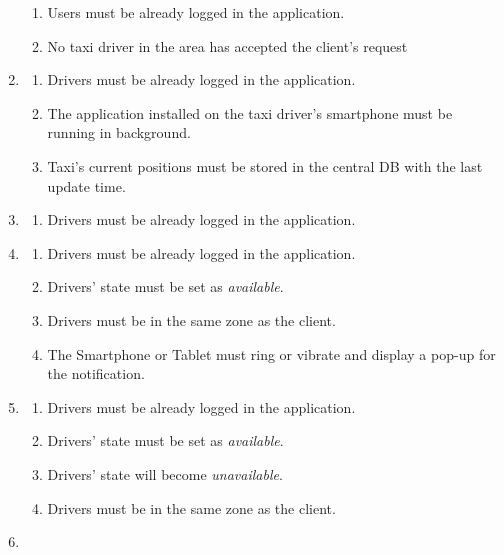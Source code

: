 \documentclass[a4paper]{article}
\begin{document}
\begin{enumerate}[label=\bfseries G\arabic*:]
\begin{enumerate}[label=\bfseries R\arabic*:]
        \item Users must be already logged in the application.
        \item No taxi driver in the area has accepted the client's request
        \end{enumerate}
    \item
        \begin{enumerate}[label=\bfseries R\arabic*:]
        \item Drivers must be already logged in the application.
        \item The application installed on the taxi driver's smartphone must be running in background.
        \item Taxi's current positions must be stored in the central DB with the last update time.
        \end{enumerate}
    \item
        \begin{enumerate}[label=\bfseries R\arabic*:]
        \item Drivers must be already logged in the application.
        \end{enumerate}
    \item
        \begin{enumerate}[label=\bfseries R\arabic*:]
        \item Drivers must be already logged in the application.
        \item Drivers' state must be set as \emph{available}.
        \item Drivers must be in the same zone as the client.
        \item The Smartphone or Tablet must ring or vibrate and display a pop-up for the notification.
        \end{enumerate}
    \item
        \begin{enumerate}[label=\bfseries R\arabic*:]
        \item Drivers must be already logged in the application.
        \item Drivers' state must be set as \emph{available}.
        \item Drivers' state will become \emph{unavailable}.
        \item Drivers must be in the same zone as the client.
        \end{enumerate}
    \item 
        \begin{enumerate}[label=\bfseries R\arabic*:]

\end{enumerate}
\end{enumerate}
\end{document}
